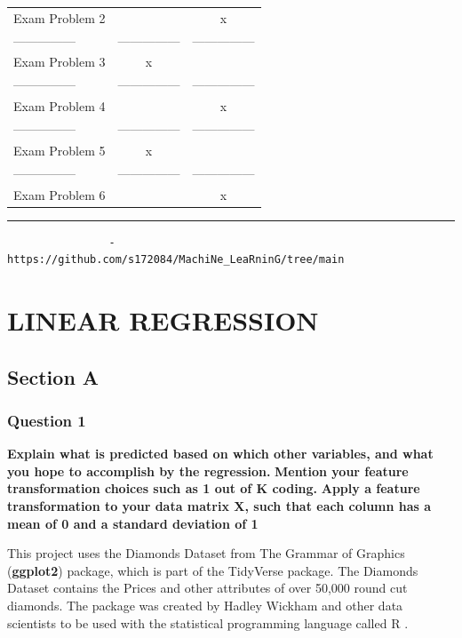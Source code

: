 \documentclass[
]{article}
\begin{document}
\begin{longtable}[]{@{}lcc@{}}
Exam Problem 2 & & x \\
--------------- & --------------- & --------------- \\
Exam Problem 3 & x & \\
--------------- & --------------- & --------------- \\
Exam Problem 4 & & x \\
--------------- & --------------- & --------------- \\
Exam Problem 5 & x & \\
--------------- & --------------- & --------------- \\
Exam Problem 6 & & x \\
\end{longtable}

\begin{center}\rule{0.5\linewidth}{0.5pt}\end{center}

\begin{verbatim}
                - https://github.com/s172084/MachiNe_LeaRninG/tree/main
\end{verbatim}

\newpage

\hypertarget{linear-regression}{%
\section{LINEAR REGRESSION}\label{linear-regression}}

\hypertarget{section-a}{%
\subsection{Section A}\label{section-a}}

\hypertarget{question-1}{%
\subsubsection{Question 1}\label{question-1}}

\textbf{Explain what is predicted based on which other variables, and
what you hope to accomplish by the regression.} \textbf{Mention your
feature transformation choices such as 1 out of K coding.} \textbf{Apply
a feature transformation to your data matrix X, such that each column
has a mean of 0 and a standard deviation of 1}

This project uses the Diamonds Dataset from The Grammar of Graphics
(\textbf{ggplot2}) package, which is part of the TidyVerse package. The
Diamonds Dataset contains the Prices and other attributes of over 50,000
round cut diamonds. The package was created by Hadley Wickham and other
data scientists to be used with the statistical programming language
called R .
\end{document}
